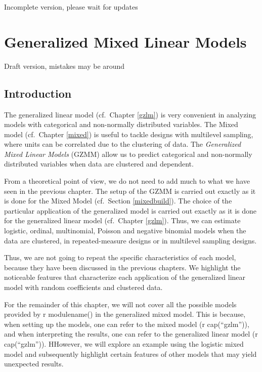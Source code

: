 \documentclass[
]{book}
\begin{document}
{ Incomplete version, please wait for updates }

\hypertarget{gmixed}{%
\chapter{Generalized Mixed Linear Models}\label{gmixed}}

{ Draft version, mistakes may be around }

\hypertarget{introduction-1}{%
\section{Introduction}\label{introduction-1}}

The generalized linear model (cf.~Chapter \ref{gzlm}) is very convenient in analyzing models with categorical and non-normally distributed variables. The Mixed model (cf.~Chapter \ref{mixed}) is useful to tackle designs with multilevel sampling, where units can be correlated due to the clustering of data. The \emph{Generalized Mixed Linear Models} (GZMM) allow us to predict categorical and non-normally distributed variables when data are clustered and dependent.

From a theoretical point of view, we do not need to add much to what we have seen in the previous chapter. The setup of the GZMM is carried out exactly as it is done for the Mixed Model (cf.~Section \ref{mixedbuild}). The choice of the particular application of the generalized model is carried out exactly as it is done for the generalized linear model (cf.~Chapter \ref{gzlm}). Thus, we can estimate logistic, ordinal, multinomial, Poisson and negative binomial models when the data are clustered, in repeated-measure designs or in multilevel sampling designs.

Thus, we are not going to repeat the specific characteristics of each model, because they have been discussed in the previous chapters. We highlight the noticeable features that characterize each application of the generalized linear model with random coefficients and clustered data.

For the remainder of this chapter, we will not cover all the possible models provided by r modulename() in the generalized mixed model. This is because, when setting up the models, one can refer to the mixed model (r cap(``gzlm'')), and when interpreting the results, one can refer to the generalized linear model (r cap(``gzlm'')). HHowever, we will explore an example using the logistic mixed model and subsequently highlight certain features of other models that may yield unexpected results.
\end{document}
